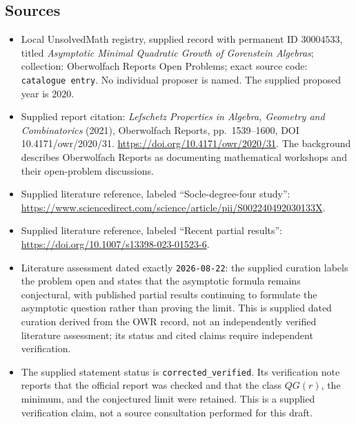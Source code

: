 \documentclass[11pt]{article}
\begin{document}
\subsection{Sources}
\begin{itemize}
\item Local UnsolvedMath registry, supplied record with permanent ID \(30004533\), titled \emph{Asymptotic Minimal Quadratic Growth of Gorenstein Algebras}; collection: Oberwolfach Reports Open Problems; exact source code: \texttt{catalogue entry}. No individual proposer is named. The supplied proposed year is \(2020\).
\item Supplied report citation: \emph{Lefschetz Properties in Algebra, Geometry and Combinatorics} (2021), Oberwolfach Reports, pp.\ 1539--1600, DOI 10.4171/owr/2020/31. \url{https://doi.org/10.4171/owr/2020/31}. The background describes Oberwolfach Reports as documenting mathematical workshops and their open-problem discussions.
\item Supplied literature reference, labeled ``Socle-degree-four study'': \url{https://www.sciencedirect.com/science/article/pii/S002240492030133X}.
\item Supplied literature reference, labeled ``Recent partial results'': \url{https://doi.org/10.1007/s13398-023-01523-6}.
\item Literature assessment dated exactly \texttt{2026-08-22}: the supplied curation labels the problem open and states that the asymptotic formula remains conjectural, with published partial results continuing to formulate the asymptotic question rather than proving the limit. This is supplied dated curation derived from the OWR record, not an independently verified literature assessment; its status and cited claims require independent verification.
\item The supplied statement status is \texttt{corrected\_verified}. Its verification note reports that the official report was checked and that the class \(QG(r)\), the minimum, and the conjectured limit were retained. This is a supplied verification claim, not a source consultation performed for this draft.
\end{itemize}
\end{document}
